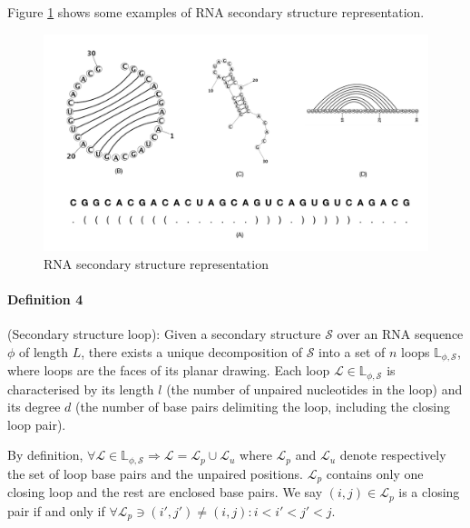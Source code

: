 Figure \ref{fig:representation} shows some examples of RNA secondary structure representation.
\begin{figure}
	\includegraphics[width=1.0 \linewidth]{../res/images/arnaque/intro/RNA_reps}
	\caption{RNA secondary structure representation}\label{fig:representation}
\end{figure}

\paragraph{\textbf{Definition 4} }(Secondary structure loop):  Given a secondary structure $\mathcal{S}$ over an RNA sequence $\phi$ of length $L$, there exists a unique decomposition of $\mathcal{S}$ into a set of $n$ loops $\mathbb{L}_{\phi, \mathcal{S}}$, where loops are the faces of its planar drawing. Each loop $\mathcal{L} \in \mathbb{L}_{\phi, \mathcal{S}}$ is characterised by its length $l$ (the number of unpaired nucleotides in the loop) and its degree $d$ (the number of base pairs delimiting the loop, including the closing loop pair). 

By definition, $\forall  \mathcal{L} \in \mathbb{L}_{\phi, \mathcal{S}} \Rightarrow \mathcal{L}  = \mathcal{L}_p \cup \mathcal{L}_u$ where $\mathcal{L}_p$ and $\mathcal{L}_u$ denote respectively the set of loop base pairs and the unpaired positions. $\mathcal{L}_p$ contains only one closing loop and the rest are enclosed base pairs. We say $(i,j) \in \mathcal{L}_p$ is a closing pair if and only if $\forall \mathcal{L}_p \ni (i',j') \neq (i,j) \colon i<i'<j'<j$.

